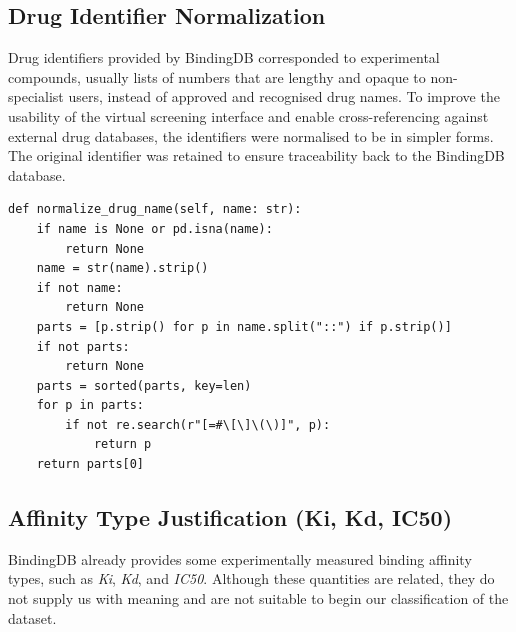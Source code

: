 \subsection{Drug Identifier Normalization}
Drug identifiers provided by BindingDB corresponded to experimental compounds, usually lists of numbers that are lengthy and opaque to non-specialist users, instead of approved and recognised drug names.
To improve the usability of the virtual screening interface and enable cross-referencing against external drug databases, the identifiers were normalised to be in simpler forms.
The original identifier was retained to ensure traceability back to the BindingDB database.
\begin{lstlisting}[caption={drug name normalisation from BindingDB identifiers}]
def normalize_drug_name(self, name: str):
    if name is None or pd.isna(name):
        return None
    name = str(name).strip()
    if not name:
        return None
    parts = [p.strip() for p in name.split("::") if p.strip()]
    if not parts:
        return None
    parts = sorted(parts, key=len)
    for p in parts:
        if not re.search(r"[=#\[\]\(\)]", p):
            return p
    return parts[0]
\end{lstlisting}


\subsection{Affinity Type Justification (Ki, Kd, IC50)}
\label{subsec:affinity-type-justification-(ki-kd-ic50)}
BindingDB already provides some experimentally measured binding affinity types, such as \textit{Ki}, \textit{Kd}, and \textit{IC50}.
Although these quantities are related, they do not supply us with meaning and are not suitable to begin our classification of the dataset.
